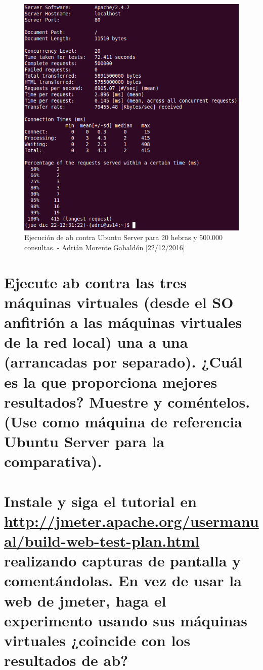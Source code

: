 \begin{figure}[H]
	\centering
	\includegraphics[scale=0.4]{ab-ubuntu}
	\caption{Ejecución de ab contra Ubuntu Server para 20 hebras y 500.000 consultas. - Adrián Morente Gabaldón [22/12/2016]}
	\label{figura4}
\end{figure}


\section{Ejecute ab contra las tres máquinas virtuales (desde el SO anfitrión a las máquinas virtuales de la red local) una a una (arrancadas por separado). ¿Cuál es la que proporciona mejores resultados? Muestre y coméntelos. (Use como máquina de referencia Ubuntu Server para la comparativa).}


\section{Instale y siga el tutorial en \href{http://jmeter.apache.org/usermanual/build-web-test-plan.html}{http://jmeter.apache.org/usermanual/build-web-test-plan.html} realizando capturas de pantalla y comentándolas. En vez de usar la web de jmeter, haga el experimento usando sus máquinas virtuales ¿coincide con los resultados de ab?}
